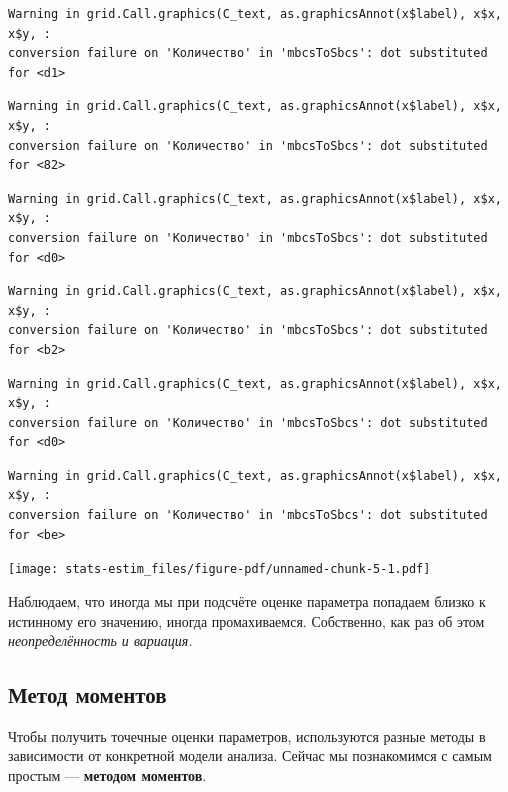 \documentclass[
  letterpaper,
  DIV=11,
  numbers=noendperiod]{scrreprt}
\theoremstyle{definition}
\theoremstyle{remark}
\begin{document}
\begin{verbatim}
Warning in grid.Call.graphics(C_text, as.graphicsAnnot(x$label), x$x, x$y, :
conversion failure on 'Количество' in 'mbcsToSbcs': dot substituted for <d1>
\end{verbatim}

\begin{verbatim}
Warning in grid.Call.graphics(C_text, as.graphicsAnnot(x$label), x$x, x$y, :
conversion failure on 'Количество' in 'mbcsToSbcs': dot substituted for <82>
\end{verbatim}

\begin{verbatim}
Warning in grid.Call.graphics(C_text, as.graphicsAnnot(x$label), x$x, x$y, :
conversion failure on 'Количество' in 'mbcsToSbcs': dot substituted for <d0>
\end{verbatim}

\begin{verbatim}
Warning in grid.Call.graphics(C_text, as.graphicsAnnot(x$label), x$x, x$y, :
conversion failure on 'Количество' in 'mbcsToSbcs': dot substituted for <b2>
\end{verbatim}

\begin{verbatim}
Warning in grid.Call.graphics(C_text, as.graphicsAnnot(x$label), x$x, x$y, :
conversion failure on 'Количество' in 'mbcsToSbcs': dot substituted for <d0>
\end{verbatim}

\begin{verbatim}
Warning in grid.Call.graphics(C_text, as.graphicsAnnot(x$label), x$x, x$y, :
conversion failure on 'Количество' in 'mbcsToSbcs': dot substituted for <be>
\end{verbatim}

\texttt{[image: stats-estim\_files/figure-pdf/unnamed-chunk-5-1.pdf]}

Наблюдаем, что иногда мы при подсчёте оценке параметра попадаем близко к
истинному его значению, иногда промахиваемся. Собственно, как раз об
этом \emph{неопределённость и вариация}.

\subsection{Метод
моментов}\label{ux43cux435ux442ux43eux434-ux43cux43eux43cux435ux43dux442ux43eux432}

Чтобы получить точечные оценки параметров, используются разные методы в
зависимости от конкретной модели анализа. Сейчас мы познакомимся с самым
простым --- \textbf{методом моментов}.
\end{document}
